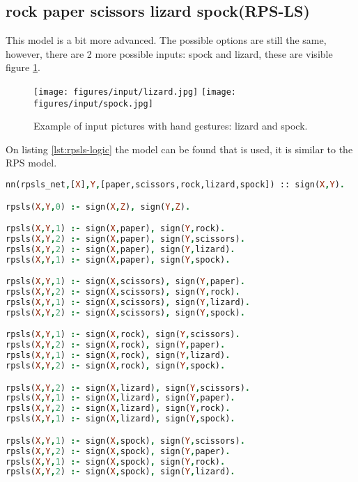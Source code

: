 \subsection{rock paper scissors lizard spock(RPS-LS)}
This model is a bit more advanced. The possible options are still the same, however, there are 2 more possible inputs: spock and lizard, these are visible figure \ref{fig:rpsls_input}. 

\begin{figure}[htp]
    \centering
    \texttt{[image: figures/input/lizard.jpg]}
    \texttt{[image: figures/input/spock.jpg]}
    \caption{Example of input pictures with hand gestures: lizard and spock\cite{RPSLS-database}.} %
    \label{fig:rpsls_input}
\end{figure}

On listing \ref{lst:rpsls-logic} the model can be found that is used, it is similar to the RPS model.

\begin{lstlisting}[label={lst:rpsls-logic},language=Prolog,frame=single,caption={Rock paper scissors lizard spock DeepProbLog model},captionpos=b]
nn(rpsls_net,[X],Y,[paper,scissors,rock,lizard,spock]) :: sign(X,Y).

rpsls(X,Y,0) :- sign(X,Z), sign(Y,Z).

rpsls(X,Y,1) :- sign(X,paper), sign(Y,rock).
rpsls(X,Y,2) :- sign(X,paper), sign(Y,scissors).
rpsls(X,Y,2) :- sign(X,paper), sign(Y,lizard).
rpsls(X,Y,1) :- sign(X,paper), sign(Y,spock).

rpsls(X,Y,1) :- sign(X,scissors), sign(Y,paper).
rpsls(X,Y,2) :- sign(X,scissors), sign(Y,rock).
rpsls(X,Y,1) :- sign(X,scissors), sign(Y,lizard).
rpsls(X,Y,2) :- sign(X,scissors), sign(Y,spock).

rpsls(X,Y,1) :- sign(X,rock), sign(Y,scissors).
rpsls(X,Y,2) :- sign(X,rock), sign(Y,paper).
rpsls(X,Y,1) :- sign(X,rock), sign(Y,lizard).
rpsls(X,Y,2) :- sign(X,rock), sign(Y,spock).

rpsls(X,Y,2) :- sign(X,lizard), sign(Y,scissors).
rpsls(X,Y,1) :- sign(X,lizard), sign(Y,paper).
rpsls(X,Y,2) :- sign(X,lizard), sign(Y,rock).
rpsls(X,Y,1) :- sign(X,lizard), sign(Y,spock).

rpsls(X,Y,1) :- sign(X,spock), sign(Y,scissors).
rpsls(X,Y,2) :- sign(X,spock), sign(Y,paper).
rpsls(X,Y,1) :- sign(X,spock), sign(Y,rock).
rpsls(X,Y,2) :- sign(X,spock), sign(Y,lizard).
    \end{lstlisting}


